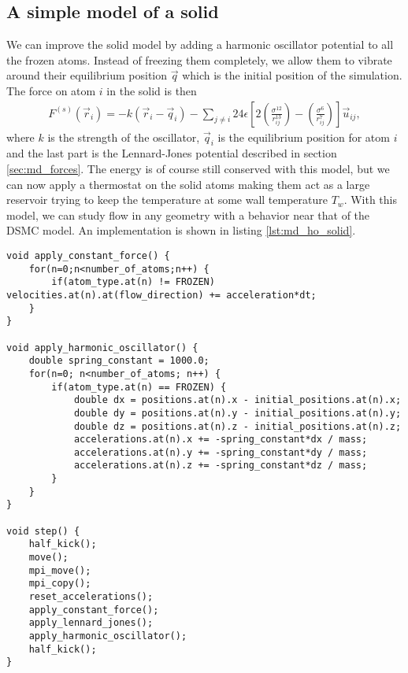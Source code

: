 \subsection{A simple model of a solid}
\label{sec:md_simple_model_of_a_solid}
We can improve the solid model by adding a harmonic oscillator potential to all the frozen atoms. Instead of freezing them completely, we allow them to vibrate around their equilibrium position $\vec q$ which is the initial position of the simulation. The force on atom $i$ in the solid is then
\begin{align}
	F^{(s)}(\vec r_i) = -k(\vec r_i - \vec q_i) 
	- \sum_{j\neq i} 24\epsilon\left[2\left(\frac{\sigma^{12}}{r_{ij}^{13}}\right) - \left(\frac{\sigma^6}{r_{ij}^7}\right)\right]\vec u_{ij},
\end{align}
where $k$ is the strength of the oscillator, $\vec q_i$ is the equilibrium position for atom $i$ and the last part is the Lennard-Jones potential described in section \ref{sec:md_forces}. The energy is of course still conserved with this model, but we can now apply a thermostat on the solid atoms making them act as a large reservoir trying to keep the temperature at some wall temperature $T_w$. With this model, we can study flow in any geometry with a behavior near that of the DSMC model. An implementation is shown in listing \ref{lst:md_ho_solid}.

\begin{lstlisting}[caption=Implementation of the harmonic oscillator model of a solid., label=lst:md_ho_solid]
void apply_constant_force() {
    for(n=0;n<number_of_atoms;n++) {
        if(atom_type.at(n) != FROZEN) velocities.at(n).at(flow_direction) += acceleration*dt;
    }
}

void apply_harmonic_oscillator() {
    double spring_constant = 1000.0;
    for(n=0; n<number_of_atoms; n++) {
        if(atom_type.at(n) == FROZEN) {
            double dx = positions.at(n).x - initial_positions.at(n).x;
            double dy = positions.at(n).y - initial_positions.at(n).y;
            double dz = positions.at(n).z - initial_positions.at(n).z;
            accelerations.at(n).x += -spring_constant*dx / mass;
            accelerations.at(n).y += -spring_constant*dy / mass;
            accelerations.at(n).z += -spring_constant*dz / mass;
        }
    }
}

void step() {
    half_kick();
    move();
    mpi_move();
    mpi_copy();
    reset_accelerations();
    apply_constant_force();
    apply_lennard_jones();
    apply_harmonic_oscillator();
    half_kick();
}
\end{lstlisting}